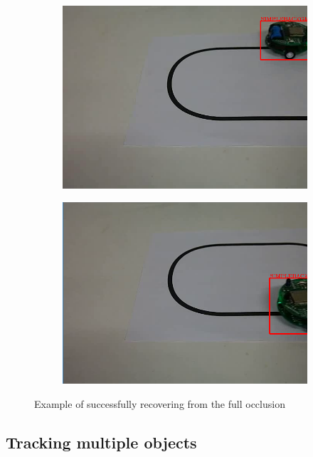 
\begin{figure}
\centering
\begin{subfigure}{0.48\linewidth}
\includegraphics[width=\linewidth]{img/experiments/occlusion1.png}
\end{subfigure}
\begin{subfigure}{0.48\linewidth}
\includegraphics[width=\linewidth]{img/experiments/occlusion2.png}
\end{subfigure}
\caption{Example of successfully recovering from the full occlusion}
\label{fig:occlusion}
\end{figure}

\subsection{Tracking multiple objects}

